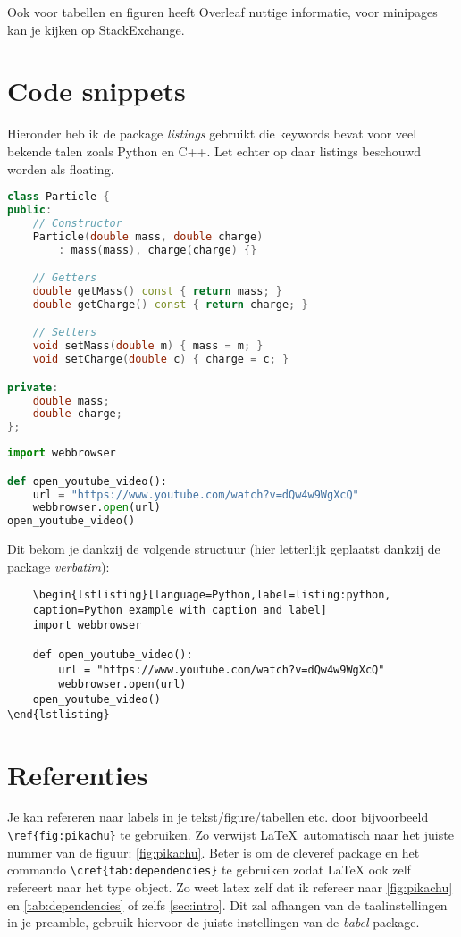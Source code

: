 \documentclass{article}
\begin{document}
Ook voor tabellen en figuren heeft Overleaf nuttige informatie\cite{OverleafFigures}, voor minipages kan je kijken op StackExchange\cite{StackExchangeMinipage}.

\section{Code snippets}
Hieronder heb ik de package \textit{listings} gebruikt die keywords bevat voor veel bekende talen zoals Python en C++.
Let echter op daar listings beschouwd worden als floating.

\begin{lstlisting}[language=C++]
class Particle {
public:
    // Constructor
    Particle(double mass, double charge) 
        : mass(mass), charge(charge) {}

    // Getters
    double getMass() const { return mass; }
    double getCharge() const { return charge; }

    // Setters
    void setMass(double m) { mass = m; }
    void setCharge(double c) { charge = c; }

private:
    double mass;
    double charge;
};
\end{lstlisting}
\begin{lstlisting}[language=Python,label=listing:python,caption=Python example with caption and label]    
import webbrowser

def open_youtube_video():
    url = "https://www.youtube.com/watch?v=dQw4w9WgXcQ"
    webbrowser.open(url)
open_youtube_video()
\end{lstlisting}

Dit bekom je dankzij de volgende structuur (hier letterlijk geplaatst dankzij de package \textit{verbatim}):
\begin{verbatim}
    \begin{lstlisting}[language=Python,label=listing:python,
    caption=Python example with caption and label]    
    import webbrowser
    
    def open_youtube_video():
        url = "https://www.youtube.com/watch?v=dQw4w9WgXcQ"
        webbrowser.open(url)
    open_youtube_video()
\end{lstlisting}
\end{verbatim}

\section{Referenties}
Je kan refereren naar labels in je tekst/figure/tabellen etc. door bijvoorbeeld \verb|\ref{fig:pikachu}| te gebruiken.
Zo verwijst \LaTeX ~automatisch naar het juiste nummer van de figuur: \ref{fig:pikachu}.
Beter is om de cleveref package en het commando \verb|\cref{tab:dependencies}| te gebruiken zodat LaTeX ook zelf refereert naar het type object.
Zo weet latex zelf dat ik refereer naar \cref{fig:pikachu} en \cref{tab:dependencies} of zelfs \cref{sec:intro}.
Dit zal afhangen van de taalinstellingen in je preamble, gebruik hiervoor de juiste instellingen van de \textit{babel} package.
\end{document}
